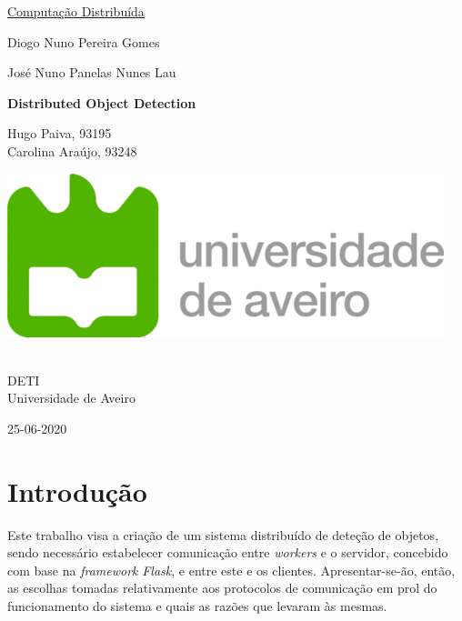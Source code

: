 \documentclass[10pt,portuguese]{article}
\begin{document}

\begin{titlepage}
	\clearpage\thispagestyle{empty}
	\centering
	\vspace{2cm}
	{\Large\underline{Computação Distribuída} \par}
	\vspace{0.5cm}
	{\small Diogo Nuno Pereira Gomes \par José Nuno Panelas Nunes Lau  \par}
	\vspace{4cm}
	{\LARGE \textbf{Distributed Object Detection}} \\ \vspace{0.5cm}
	\vspace{5cm}
	{\normalsize Hugo Paiva, 93195
	        \\Carolina Araújo, 93248 \par}
	\vspace{2cm}
    \includegraphics[scale=0.20]{logo_ua.png}
    \vspace{2cm}
	{\normalsize \\DETI \\Universidade de Aveiro \par}
	{\normalsize 25-06-2020 \par}
	\vspace{2cm}
	\pagebreak
\end{titlepage}

\newpage
\section{Introdução}
\par Este trabalho visa a criação de um sistema distribuído de deteção de objetos, sendo necessário estabelecer comunicação entre \textit{workers} e o servidor, concebido com base na \textit{framework} \textit{Flask}, e entre este e os clientes. Apresentar-se-ão, então, as escolhas tomadas relativamente aos protocolos de comunicação em prol do funcionamento do sistema e quais as razões que levaram às mesmas.
\end{document}
